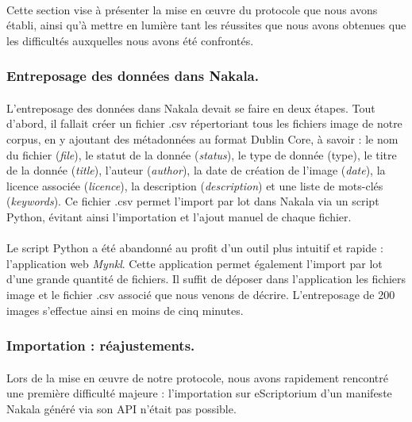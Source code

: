 \documentclass[a4paper,12pt,twoside]{book}
\begin{document}
\paragraph{}
Cette section vise à présenter la mise en œuvre du protocole que nous avons établi, ainsi qu'à mettre en lumière tant les réussites que nous avons obtenues que les difficultés auxquelles nous avons été confrontés.

		\subsubsection{Entreposage des données dans Nakala.}
		
\paragraph{}
L'entreposage des données dans Nakala devait se faire en deux étapes. Tout d'abord, il fallait créer un fichier .csv répertoriant tous les fichiers image de notre corpus, en y ajoutant des métadonnées au format Dublin Core, à savoir : le nom du fichier (\textit{file}), le statut de la donnée (\textit{status}), le type de donnée (type), le titre de la donnée (\textit{title}), l’auteur (\textit{author}), la date de création de l’image (\textit{date}), la licence associée (\textit{licence}), la description (\textit{description}) et une liste de mots-clés (\textit{keywords}). Ce fichier .csv permet l’import par lot dans Nakala via un script Python, évitant ainsi l'importation et l'ajout manuel de chaque fichier.

\paragraph{}
Le script Python a été abandonné au profit d’un outil plus intuitif et rapide : l’application web \textit{Mynkl}. Cette application permet également l’import par lot d’une grande quantité de fichiers. Il suffit de déposer dans l’application les fichiers image et le fichier .csv associé que nous venons de décrire. L'entreposage de 200 images s'effectue ainsi en moins de cinq minutes.


		
		\subsubsection{Importation : réajustements.}

\paragraph{}		
Lors de la mise en œuvre de notre protocole, nous avons rapidement rencontré une première difficulté majeure : l’importation sur eScriptorium d’un manifeste Nakala généré via son API n’était pas possible. 
\end{document}
